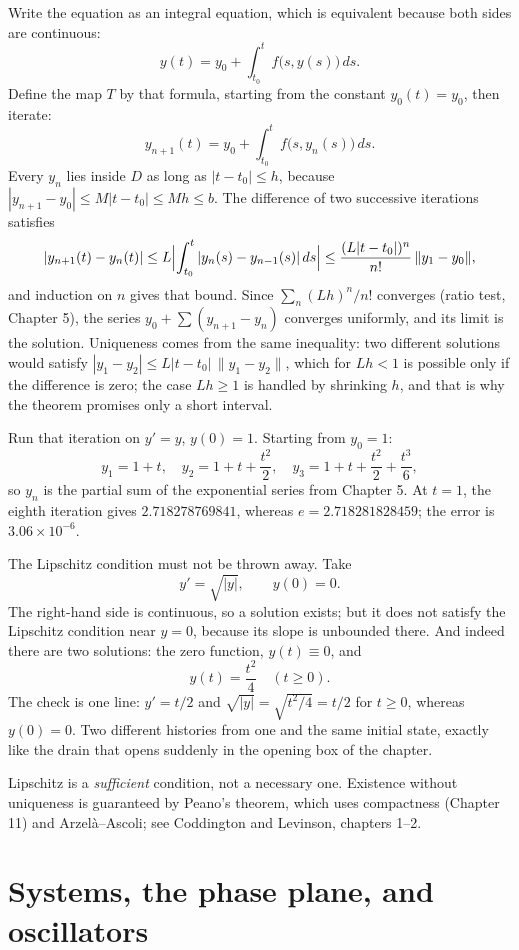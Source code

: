 Write the equation as an integral equation, which is equivalent because both sides are
continuous:
\[
y(t)=y_{0}+\int_{t_{0}}^{t}f\bigl(s,y(s)\bigr)\,ds .
\]
Define the map $T$ by that formula, starting from the constant $y_{0}(t)=y_{0}$, then
iterate:
\[
y_{n+1}(t)=y_{0}+\int_{t_{0}}^{t}f\bigl(s,y_{n}(s)\bigr)\,ds .
\]
Every $y_{n}$ lies inside $D$ as long as $|t-t_{0}|\le h$, because
$|y_{n+1}-y_{0}|\le M|t-t_{0}|\le Mh\le b$. The difference of two successive iterations
satisfies
\[
|y_{n+1}(t)-y_{n}(t)|\le L\Bigl|\int_{t_{0}}^{t}|y_{n}(s)-y_{n-1}(s)|\,ds\Bigr|
\le \frac{(L|t-t_{0}|)^{n}}{n!}\,\|y_{1}-y_{0}\| ,
\]
and induction on $n$ gives that bound. Since $\sum_{n}(Lh)^{n}/n!$ converges
(ratio test, Chapter 5), the series $y_{0}+\sum(y_{n+1}-y_{n})$ converges uniformly, and
its limit is the solution. Uniqueness comes from the same inequality: two different solutions
would satisfy $|y_{1}-y_{2}|\le L|t-t_{0}|\,\|y_{1}-y_{2}\|$, which for $Lh<1$ is possible
only if the difference is zero; the case $Lh\ge1$ is handled by shrinking $h$, and that is
why the theorem promises only a short interval.

Run that iteration on $y'=y$, $y(0)=1$. Starting from $y_{0}=1$:
\[
y_{1}=1+t,\quad y_{2}=1+t+\frac{t^{2}}{2},\quad
y_{3}=1+t+\frac{t^{2}}{2}+\frac{t^{3}}{6},
\]
so $y_{n}$ is the partial sum of the exponential series from Chapter 5. At $t=1$, the eighth
iteration gives $2.718278769841$, whereas $e=2.718281828459$; the error is
$3.06\times10^{-6}$.

The Lipschitz condition must not be thrown away. Take
\[
y'=\sqrt{|y|},\qquad y(0)=0 .
\]
The right-hand side is continuous, so a solution exists; but it does not satisfy the
Lipschitz condition near $y=0$, because its slope is unbounded there. And indeed there are
two solutions: the zero function, $y(t)\equiv0$, and
\[
y(t)=\frac{t^{2}}{4}\quad (t\ge0).
\]
The check is one line: $y'=t/2$ and $\sqrt{|y|}=\sqrt{t^{2}/4}=t/2$ for
$t\ge0$, whereas $y(0)=0$. Two different histories from one and the same initial state,
exactly like the drain that opens suddenly in the opening box of the chapter.

Lipschitz is a \emph{sufficient} condition, not a necessary one. Existence without
uniqueness is guaranteed by Peano's theorem, which uses compactness (Chapter 11) and
Arzel\`a--Ascoli; see Coddington and Levinson, chapters 1--2.

\section{Systems, the phase plane, and oscillators}

